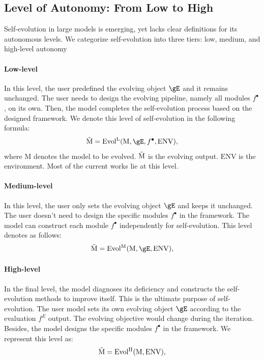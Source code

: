 \documentclass[sn-basic, Numbered]{sn-jnl}%
\theoremstyle{thmstyleone}%
\theoremstyle{thmstyletwo}%
\theoremstyle{thmstylethree}%
\begin{document}
\subsection{Level of Autonomy: From Low to High}
\label{sec:autonomous level}
Self-evolution in large models is emerging, yet lacks clear definitions for its autonomous levels. We categorize self-evolution into three tiers: low, medium, and high-level autonomy
\noindent\paragraph{Low-level} In this level, the user predefined the evolving object $\gE$ and it remains unchanged. The user needs to design the evolving pipeline, namely all modules $f^{\bullet}$, on its own. Then, the model completes the self-evolution process based on the designed framework. We denote this level of self-evolution in the following formula:
\begin{equation}
    \mathrm{\Tilde{M}} = \mathrm{Evol^{L}}(\mathrm{M}, \gE, f^{\bullet}, \mathrm{ENV}),
\end{equation}
where $\mathrm{M}$ denotes the model to be evolved. $\mathrm{\Tilde{M}}$ is the evolving output. $\mathrm{ENV}$ is the environment. Most of the current works lie at this level.

\noindent\paragraph{Medium-level} In this level, the user only sets the evolving object $\gE$ and keeps it unchanged. 
The user doesn't need to design the specific modules $f^{\bullet}$ in the framework. The model can construct each module $f^{\bullet}$ independently for self-evolution. This level denotes as follows:
\begin{equation}
    \mathrm{\Tilde{M}} = \mathrm{Evol^{M}}(\mathrm{M}, \gE, \mathrm{ENV}),
\end{equation}

\noindent\paragraph{High-level} In the final level, the model diagnoses its deficiency and constructs the self-evolution methods to improve itself. This is the ultimate purpose of self-evolution. The user model sets its own evolving object $\gE$ according to the evaluation $f^{E}$ output. The evolving objective would change during the iteration. 
Besides, the model designs the specific modules $f^{\bullet}$ in the framework. 
We represent this level as:
\begin{equation}
    \mathrm{\Tilde{M}} = \mathrm{Evol^{H}}(\mathrm{M}, \mathrm{ENV}),
\end{equation}
\end{document}
